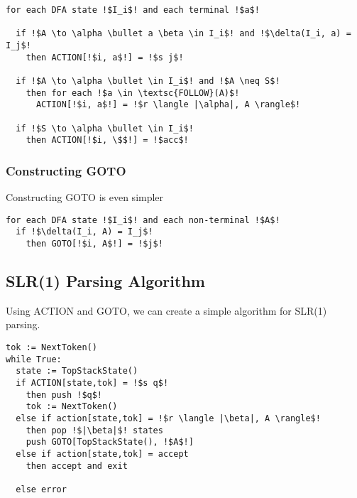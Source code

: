 \begin{code}
\begin{lstlisting}[style=pseudocode]
for each DFA state !$I_i$! and each terminal !$a$!

  if !$A \to \alpha \bullet a \beta \in I_i$! and !$\delta(I_i, a) = I_j$! 
    then ACTION[!$i, a$!] = !$s j$!
    
  if !$A \to \alpha \bullet \in I_i$! and !$A \neq S$! 
    then for each !$a \in \textsc{FOLLOW}(A)$!
      ACTION[!$i, a$!] = !$r \langle |\alpha|, A \rangle$!
      
  if !$S \to \alpha \bullet \in I_i$! 
    then ACTION[!$i, \$$!] = !$acc$!
\end{lstlisting}
\vspace{1mm}
\end{code}

\subsubsection{Constructing GOTO}
Constructing GOTO is even simpler

\begin{code}
\begin{lstlisting}[style=pseudocode]
for each DFA state !$I_i$! and each non-terminal !$A$!
  if !$\delta(I_i, A) = I_j$! 
    then GOTO[!$i, A$!] = !$j$!
\end{lstlisting}
\vspace{1mm}
\end{code}

\subsection{SLR(1) Parsing Algorithm}
Using ACTION and GOTO, we can create a simple algorithm for SLR(1) parsing.

\begin{code}
\begin{lstlisting}[style=pseudocode]
tok := NextToken()
while True:
  state := TopStackState()
  if ACTION[state,tok] = !$s q$!
    then push !$q$!
    tok := NextToken()
  else if action[state,tok] = !$r \langle |\beta|, A \rangle$!
    then pop !$|\beta|$! states
    push GOTO[TopStackState(), !$A$!]
  else if action[state,tok] = accept
    then accept and exit
    
  else error
\end{lstlisting}
\vspace{1mm}
\end{code}

